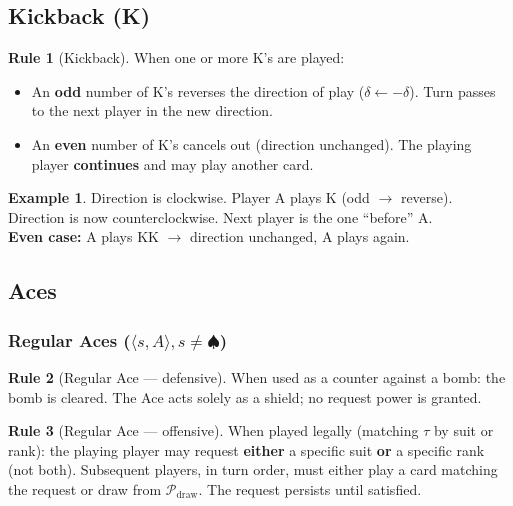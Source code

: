 \documentclass[11pt,a4paper,twoside]{article}
\theoremstyle{definition}
\newtheorem{rule}{Rule}[section]
\newtheorem{example}{Example}[section]
\theoremstyle{remark}
\newcommand{\Card}[2]{\ensuremath{\langle #1, #2 \rangle}}
\newcommand{\Pile}{\ensuremath{\mathcal{P}}}
\newcommand{\Top}{\ensuremath{\tau}}
\newcommand{\Dir}{\ensuremath{\delta}}
\begin{document}
\subsection{Kickback (K)}
\label{sec:kickback}

\begin{rule}[Kickback]
  When one or more K's are played:
  \begin{itemize}[nosep]
    \item An \textbf{odd} number of K's reverses the direction of play
          ($\Dir \leftarrow -\Dir$). Turn passes to the next player in the
          new direction.
    \item An \textbf{even} number of K's cancels out (direction unchanged).
          The playing player \textbf{continues} and may play another card.
  \end{itemize}
\end{rule}

\begin{example}
  Direction is clockwise. Player A plays K (odd $\to$ reverse).\\
  Direction is now counterclockwise. Next player is the one ``before'' A.\\
  \textbf{Even case:} A plays KK $\to$ direction unchanged, A plays again.
\end{example}

\subsection{Aces}
\label{sec:ace}

\subsubsection{Regular Aces ($\Card{s}{A}, s \neq \spadesuit$)}

\begin{rule}[Regular Ace --- defensive]
  When used as a counter against a bomb: the bomb is cleared. The Ace acts
  solely as a shield; no request power is granted.
\end{rule}

\begin{rule}[Regular Ace --- offensive]
  When played legally (matching $\Top$ by suit or rank): the playing player
  may request \textbf{either} a specific suit \textbf{or} a specific rank
  (not both). Subsequent players, in turn order, must either play a card
  matching the request or draw from $\Pile_{\text{draw}}$. The request
  persists until satisfied.
\end{rule}
\end{document}
